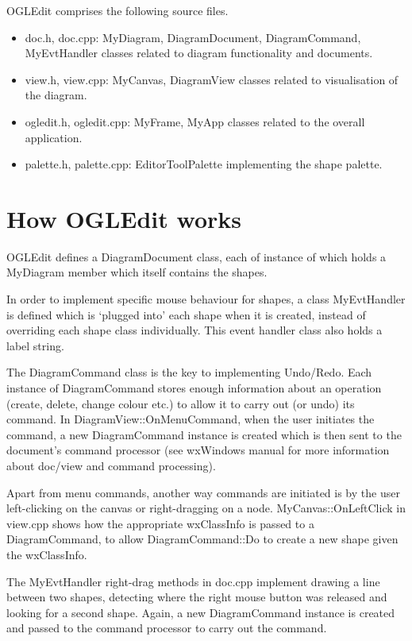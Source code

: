 OGLEdit comprises the following source files.

\begin{itemize}\itemsep=0pt
\item doc.h, doc.cpp: MyDiagram, DiagramDocument, DiagramCommand, MyEvtHandler
classes related to diagram functionality and documents.
\item view.h, view.cpp: MyCanvas, DiagramView classes related to visualisation of
the diagram.
\item ogledit.h, ogledit.cpp: MyFrame, MyApp classes related to the overall application.
\item palette.h, palette.cpp: EditorToolPalette implementing the shape palette.
\end{itemize}

\section{How OGLEdit works}

OGLEdit defines a DiagramDocument class, each of instance of which holds a MyDiagram
member which itself contains the shapes.

In order to implement specific mouse behaviour for shapes, a class MyEvtHandler is
defined which is `plugged into' each shape when it is created, instead of overriding each shape class
individually. This event handler class also holds a label string.

The DiagramCommand class is the key to implementing Undo/Redo. Each instance of DiagramCommand
stores enough information about an operation (create, delete, change colour etc.) to allow
it to carry out (or undo) its command. In DiagramView::OnMenuCommand, when the user initiates the
command, a new DiagramCommand instance is created which is then sent to the document's
command processor (see wxWindows manual for more information about doc/view and command
processing).

Apart from menu commands, another way commands are initiated is by the user left-clicking on
the canvas or right-dragging on a node. MyCanvas::OnLeftClick in view.cpp shows how
the appropriate wxClassInfo is passed to a DiagramCommand, to allow DiagramCommand::Do
to create a new shape given the wxClassInfo.

The MyEvtHandler right-drag methods in doc.cpp implement drawing a line between
two shapes, detecting where the right mouse button was released and looking for a second
shape. Again, a new DiagramCommand instance is created and passed to the command
processor to carry out the command.

